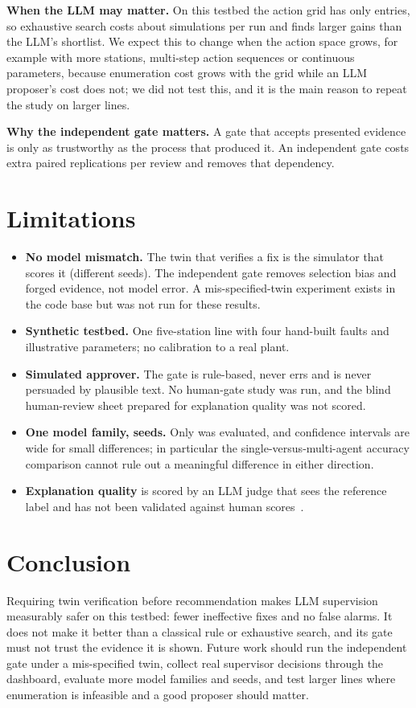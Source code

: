 \documentclass[conference]{IEEEtran}
\begin{document}
\textbf{When the LLM may matter.} On this testbed the action grid has only \TwinGrid{} entries, so exhaustive
search costs about \TwinSims{} simulations per run and finds larger gains than the LLM's shortlist. We expect
this to change when the action space grows, for example with more stations, multi-step action sequences or
continuous parameters, because enumeration cost grows with the grid while an LLM proposer's cost does not;
we did not test this, and it is the main reason to repeat the study on larger lines.

\textbf{Why the independent gate matters.} A gate that accepts presented evidence is only as trustworthy as
the process that produced it. An independent gate costs \NReps{} extra paired replications per review and
removes that dependency.

\section{Limitations}
\label{sec:limits}
\begin{itemize}
  \item \textbf{No model mismatch.} The twin that verifies a fix is the simulator that scores it (different
        seeds). The independent gate removes selection bias and forged evidence, not model error. A
        mis-specified-twin experiment exists in the code base but was not run for these results.
  \item \textbf{Synthetic testbed.} One five-station line with four hand-built faults and illustrative
        parameters; no calibration to a real plant.
  \item \textbf{Simulated approver.} The gate is rule-based, never errs and is never persuaded by plausible
        text. No human-gate study was run, and the blind human-review sheet prepared for explanation quality
        was not scored.
  \item \textbf{One model family, \Nseeds{} seeds.} Only \Model{} was evaluated, and confidence intervals are
        wide for small differences; in particular the single-versus-multi-agent accuracy comparison cannot rule
        out a meaningful difference in either direction.
  \item \textbf{Explanation quality} is scored by an LLM judge that sees the reference label and has not been
        validated against human scores~\cite{zheng2023judge}.
\end{itemize}

\section{Conclusion}
Requiring twin verification before recommendation makes LLM supervision measurably safer on this testbed:
fewer ineffective fixes and no false alarms. It does not make it better than a classical rule or exhaustive
search, and its gate must not trust the evidence it is shown. Future work should run the independent gate
under a mis-specified twin, collect real supervisor decisions through the dashboard, evaluate more model
families and seeds, and test larger lines where enumeration is infeasible and a good proposer should matter.
\end{document}
